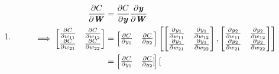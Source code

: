 \documentclass{article}
\begin{document}
\begin{enumerate}
    \item   \begin{equation}
                \begin{split}
                    \frac{\partial C}{\partial \textbf{\textit{W}}}&=\frac{\partial C}{\partial \textbf{\textit{y}}}\frac{\partial \textbf{\textit{y}}}{\partial \textbf{\textit{W}}}\\
                    \implies\begin{bmatrix}
                                \frac{\partial C}{\partial w_{11}}&\frac{\partial C}{\partial w_{12}}\\
                                \frac{\partial C}{\partial w_{21}}&\frac{\partial C}{\partial w_{22}}
                             \end{bmatrix}
                             &=
                             \begin{bmatrix}
                                \frac{\partial C}{\partial y_{1}}&\frac{\partial C}{\partial y_{2}}
                            \end{bmatrix}
                            \begin{bmatrix}
                                \begin{bmatrix}
                                    \frac{\partial y_{1}}{\partial w_{11}}&\frac{\partial y_{1}}{\partial w_{12}}\\
                                    \frac{\partial y_{1}}{\partial w_{21}}&\frac{\partial y_{1}}{\partial w_{22}}
                                \end{bmatrix},
                                \begin{bmatrix}
                                    \frac{\partial y_{2}}{\partial w_{11}}&\frac{\partial y_{2}}{\partial w_{12}}\\
                                    \frac{\partial y_{2}}{\partial w_{21}}&\frac{\partial y_{2}}{\partial w_{22}}
                                \end{bmatrix}
                            \end{bmatrix}\\
                            &= \begin{bmatrix}
                                \frac{\partial C}{\partial y_{1}}&\frac{\partial C}{\partial y_{2}}
                            \end{bmatrix}
                            \begin{bmatrix}

\end{bmatrix}
\end{split}
\end{equation}
\end{enumerate}
\end{document}
